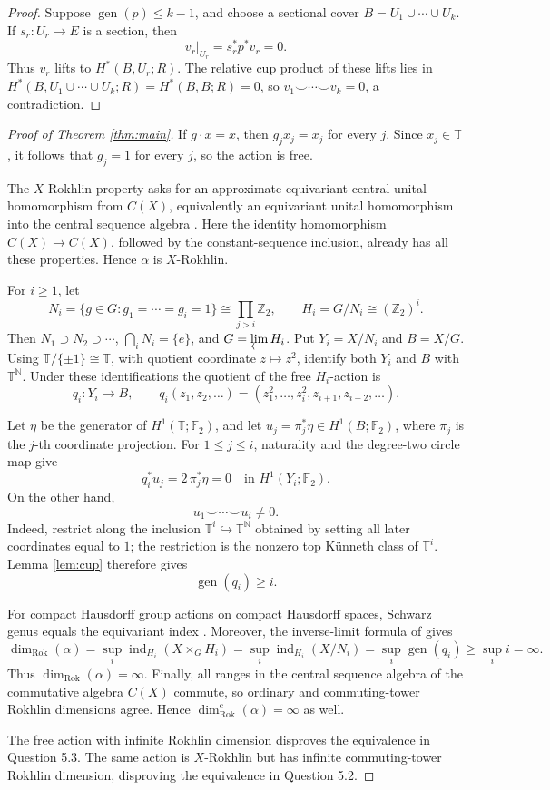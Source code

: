 \documentclass[11pt]{article}
\newcommand{\T}{\mathbb T}
\newcommand{\F}{\mathbb F}
\newcommand{\Rok}{\operatorname{dim}_{\mathrm{Rok}}}
\newcommand{\eind}{\operatorname{ind}}
\newcommand{\genus}{\operatorname{gen}}
\begin{document}
\begin{proof}
Suppose \(\genus(p)\leq k-1\), and choose a sectional cover \(B=U_1\cup\cdots\cup U_k\). If \(s_r:U_r\to E\) is a section, then
\[
v_r|_{U_r}=s_r^*p^*v_r=0.
\]
Thus \(v_r\) lifts to \(H^*(B,U_r;R)\). The relative cup product of these lifts lies in
\(H^*(B,U_1\cup\cdots\cup U_k;R)=H^*(B,B;R)=0\), so
\(v_1\smile\cdots\smile v_k=0\), a contradiction.
\end{proof}

\begin{proof}[Proof of Theorem \ref{thm:main}]
If \(g\cdot x=x\), then \(g_jx_j=x_j\) for every \(j\). Since \(x_j\in\T\), it follows that \(g_j=1\) for every \(j\), so the action is free.

The \(X\)-Rokhlin property asks for an approximate equivariant central unital homomorphism from \(C(X)\), equivalently an equivariant unital homomorphism into the central sequence algebra \cite[Definition 1.5]{HP}. Here the identity homomorphism \(C(X)\to C(X)\), followed by the constant-sequence inclusion, already has all these properties. Hence \(\alpha\) is \(X\)-Rokhlin.

For \(i\geq1\), let
\[
N_i=\{g\in G:g_1=\cdots=g_i=1\}
   \cong\prod_{j>i}\mathbb Z_2,
\qquad
H_i=G/N_i\cong(\mathbb Z_2)^i.
\]
Then \(N_1\supset N_2\supset\cdots\), \(\bigcap_iN_i=\{e\}\), and \(G=\varprojlim H_i\). Put \(Y_i=X/N_i\) and \(B=X/G\). Using \(\T/\{\pm1\}\cong\T\), with quotient coordinate \(z\mapsto z^2\), identify both \(Y_i\) and \(B\) with \(\T^{\mathbb N}\). Under these identifications the quotient of the free \(H_i\)-action is
\[
q_i:Y_i\longrightarrow B,
\qquad
q_i(z_1,z_2,\ldots)
=(z_1^2,\ldots,z_i^2,z_{i+1},z_{i+2},\ldots).
\]

Let \(\eta\) be the generator of \(H^1(\T;\F_2)\), and let
\(u_j=\pi_j^*\eta\in H^1(B;\F_2)\), where \(\pi_j\) is the \(j\)-th coordinate projection. For \(1\leq j\leq i\), naturality and the degree-two circle map give
\[
q_i^*u_j=2\,\pi_j^*\eta=0
\quad\text{in }H^1(Y_i;\F_2).
\]
On the other hand,
\[
u_1\smile\cdots\smile u_i\neq0.
\]
Indeed, restrict along the inclusion \(\T^i\hookrightarrow\T^{\mathbb N}\) obtained by setting all later coordinates equal to \(1\); the restriction is the nonzero top K\"unneth class of \(\T^i\). Lemma \ref{lem:cup} therefore gives
\[
\genus(q_i)\geq i.
\]

For compact Hausdorff group actions on compact Hausdorff spaces, Schwarz genus equals the equivariant index \cite[Proposition 4.4]{GHTW}. Moreover, the inverse-limit formula of \cite[Corollary 5.15]{GHTW} gives
\[
\Rok(\alpha)
=\sup_i\eind_{H_i}(X\mathbin{\times_G}H_i)
=\sup_i\eind_{H_i}(X/N_i)
=\sup_i\genus(q_i)
\geq\sup_i i
=\infty.
\]
Thus \(\Rok(\alpha)=\infty\). Finally, all ranges in the central sequence algebra of the commutative algebra \(C(X)\) commute, so ordinary and commuting-tower Rokhlin dimensions agree. Hence \(\Rok^{\mathrm c}(\alpha)=\infty\) as well.

The free action with infinite Rokhlin dimension disproves the equivalence in Question 5.3. The same action is \(X\)-Rokhlin but has infinite commuting-tower Rokhlin dimension, disproving the equivalence in Question 5.2.
\end{proof}
\end{document}
